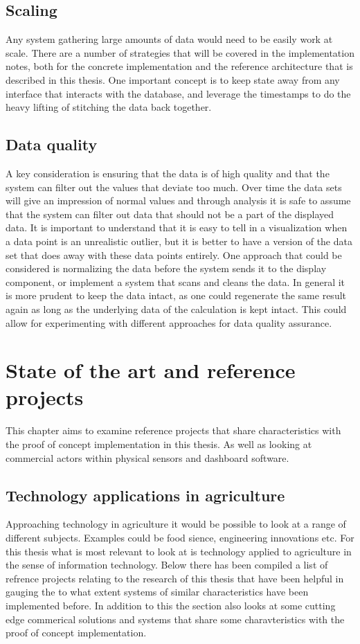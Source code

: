 \documentclass[]{uiophd}
\begin{document}
\section{Scaling}
Any system gathering large amounts of data would need to be easily work at scale. There are a number of strategies that will be covered in the implementation notes, both for the concrete implementation and the reference architecture that is described in this thesis. One important concept is to keep state away from any interface that interacts with the database, and leverage the timestamps to do the heavy lifting of stitching the data back together.
\section{Data quality}
A key consideration is ensuring that the data is of high quality and that the system can filter out the values that deviate too much. Over time the data sets will give an impression of normal values and through analysis it is safe to assume that the system can filter out data that should not be a part of the displayed data. It is important to understand that it is easy to tell in a visualization when a data point is an unrealistic outlier, but it is better to have a version of the data set that does away with these data points entirely. One approach that could be considered is normalizing the data before the system sends it to the display component, or implement a system that scans and cleans the data. In general it is more prudent to keep the data intact, as one could regenerate the same result again as long as the underlying data of the calculation is kept intact. This could allow for experimenting with different approaches for data quality assurance.

\chapter{State of the art and reference projects}
This chapter aims to examine reference projects that share characteristics with the proof of concept implementation in this thesis. As well as looking at commercial actors within physical sensors and dashboard software.
\section{Technology applications in agriculture}
Approaching technology in agriculture it would be possible to look at a range of different subjects. Examples could be food sience, engineering innovations etc. For this thesis what is most relevant to look at is technology applied to agriculture in the sense of information technology. Below there has been compiled a list of refrence projects relating to the research of this thesis that have been helpful in gauging the to what extent systems of similar characteristics have been implemented before. In addition to this the section also looks at some cutting edge commerical solutions and systems that share some charavteristics with the proof of concept implementation.
\end{document}
